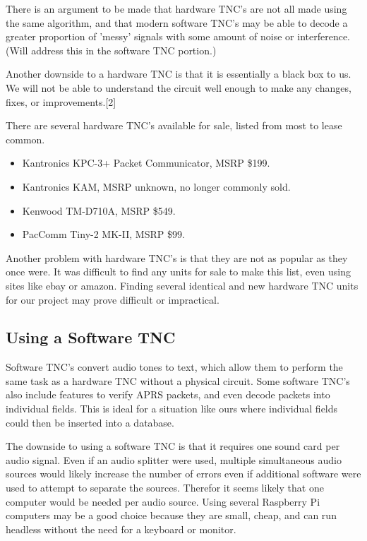 \documentclass[onecolumn, draftclsnofoot, 10pt, compsoc]{IEEEtran}
\begin{document}
There is an argument to be made that hardware TNC's are not all made using the same algorithm, and that modern software TNC's may be able to decode a greater proportion of 'messy' signals with some amount of noise or interference.  (Will address this in the software TNC portion.)

Another downside to a hardware TNC is that it is essentially a black box to us.  We will not be able to understand the circuit well enough to make any changes, fixes, or improvements.[2]

There are several hardware TNC's available for sale, listed from most to lease common.
\begin{itemize}
	\item Kantronics KPC-3+ Packet Communicator, MSRP \$199.
    \item Kantronics KAM, MSRP unknown, no longer commonly sold.
    \item Kenwood TM-D710A, MSRP \$549.
    \item PacComm Tiny-2 MK-II, MSRP \$99.
\end{itemize}

Another problem with hardware TNC's is that they are not as popular as they once were.  It was difficult to find any units for sale to make this list, even using sites like ebay or amazon.  Finding several identical and new hardware TNC units for our project may prove difficult or impractical.

\subsection{Using a Software TNC}

Software TNC's convert audio tones to text, which allow them to perform the same task as a hardware TNC without a physical circuit.  Some software TNC's also include features to verify APRS packets, and even decode packets into individual fields.  This is ideal for a situation like ours where individual fields could then be inserted into a database.

The downside to using a software TNC is that it requires one sound card per audio signal.  Even if an audio splitter were used, multiple simultaneous audio sources would likely increase the number of errors even if additional software were used to attempt to separate the sources.  Therefor it seems likely that one computer would be needed per audio source.  Using several Raspberry Pi computers may be a good choice because they are small, cheap, and can run headless without the need for a keyboard or monitor.
\end{document}
